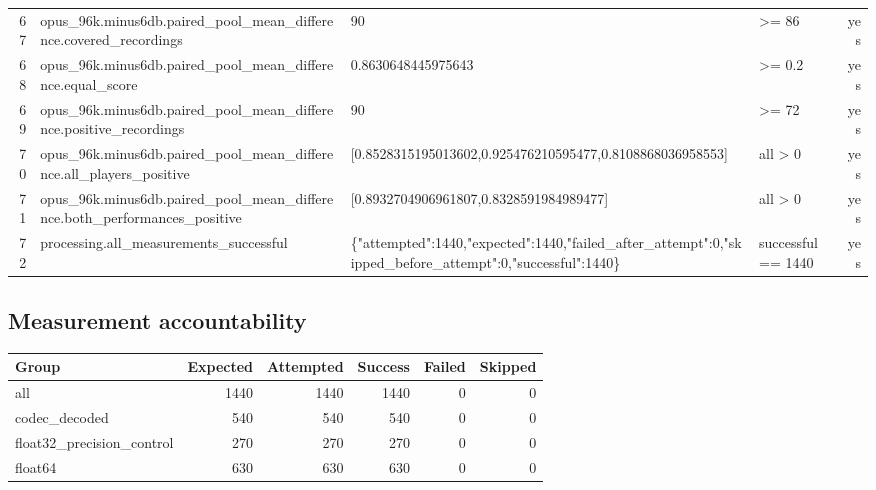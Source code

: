 \documentclass{article}
\begin{document}
\begin{longtable}{r p{5cm} p{4cm} p{2.5cm} r}
67 & opus\_\allowbreak{}96k.\allowbreak{}minus6db.\allowbreak{}paired\_\allowbreak{}pool\_\allowbreak{}mean\_\allowbreak{}difference.\allowbreak{}covered\_\allowbreak{}recordings & 90 & >= 86 & yes \\
68 & opus\_\allowbreak{}96k.\allowbreak{}minus6db.\allowbreak{}paired\_\allowbreak{}pool\_\allowbreak{}mean\_\allowbreak{}difference.\allowbreak{}equal\_\allowbreak{}score & 0.\allowbreak{}8630648445975643 & >= 0.\allowbreak{}2 & yes \\
69 & opus\_\allowbreak{}96k.\allowbreak{}minus6db.\allowbreak{}paired\_\allowbreak{}pool\_\allowbreak{}mean\_\allowbreak{}difference.\allowbreak{}positive\_\allowbreak{}recordings & 90 & >= 72 & yes \\
70 & opus\_\allowbreak{}96k.\allowbreak{}minus6db.\allowbreak{}paired\_\allowbreak{}pool\_\allowbreak{}mean\_\allowbreak{}difference.\allowbreak{}all\_\allowbreak{}players\_\allowbreak{}positive & [0.\allowbreak{}8528315195013602,\allowbreak{}0.\allowbreak{}925476210595477,\allowbreak{}0.\allowbreak{}8108868036958553] & all > 0 & yes \\
71 & opus\_\allowbreak{}96k.\allowbreak{}minus6db.\allowbreak{}paired\_\allowbreak{}pool\_\allowbreak{}mean\_\allowbreak{}difference.\allowbreak{}both\_\allowbreak{}performances\_\allowbreak{}positive & [0.\allowbreak{}8932704906961807,\allowbreak{}0.\allowbreak{}8328591984989477] & all > 0 & yes \\
72 & processing.\allowbreak{}all\_\allowbreak{}measurements\_\allowbreak{}successful & \{"attempted":\allowbreak{}1440,\allowbreak{}"expected":\allowbreak{}1440,\allowbreak{}"failed\_\allowbreak{}after\_\allowbreak{}attempt":\allowbreak{}0,\allowbreak{}"skipped\_\allowbreak{}before\_\allowbreak{}attempt":\allowbreak{}0,\allowbreak{}"successful":\allowbreak{}1440\} & successful == 1440 & yes \\
\end{longtable}
\subsection*{Measurement accountability}
\begin{tabular}{lrrrrr}
Group & Expected & Attempted & Success & Failed & Skipped\\\hline
all & 1440 & 1440 & 1440 & 0 & 0 \\
codec\_\allowbreak{}decoded & 540 & 540 & 540 & 0 & 0 \\
float32\_\allowbreak{}precision\_\allowbreak{}control & 270 & 270 & 270 & 0 & 0 \\
float64 & 630 & 630 & 630 & 0 & 0 \\
\end{tabular}
\begingroup\raggedright
\end{document}
